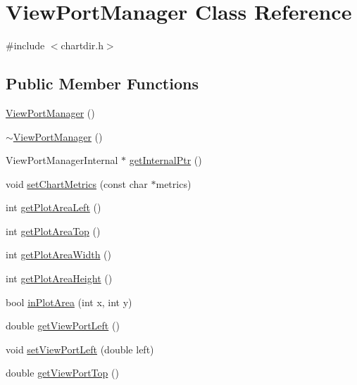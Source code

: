 \hypertarget{class_view_port_manager}{}\section{View\+Port\+Manager Class Reference}
\label{class_view_port_manager}


{\ttfamily \#include $<$chartdir.\+h$>$}

\subsection*{Public Member Functions}
\begin{DoxyCompactItemize}
\item 
\hyperlink{class_view_port_manager_aa1b652e4a2d4d11c50bcb6070506cc52}{View\+Port\+Manager} ()
\item 
\hyperlink{class_view_port_manager_a246382d798570dd477efd4da1946778d}{$\sim$\+View\+Port\+Manager} ()
\item 
View\+Port\+Manager\+Internal $\ast$ \hyperlink{class_view_port_manager_af3aa3a669ee164439737ea284c6c9cdf}{get\+Internal\+Ptr} ()
\item 
void \hyperlink{class_view_port_manager_af4bdc161db91ed516987f6a358f02bab}{set\+Chart\+Metrics} (const char $\ast$metrics)
\item 
int \hyperlink{class_view_port_manager_a244345729e7f3798f509031a72bf7362}{get\+Plot\+Area\+Left} ()
\item 
int \hyperlink{class_view_port_manager_a4f4797760398802b6cc12970f57e3039}{get\+Plot\+Area\+Top} ()
\item 
int \hyperlink{class_view_port_manager_a343ea77ab814cfbb1e47322d11eebf9e}{get\+Plot\+Area\+Width} ()
\item 
int \hyperlink{class_view_port_manager_a27afd05fac15bcaa4f06eb9bc675a6d0}{get\+Plot\+Area\+Height} ()
\item 
bool \hyperlink{class_view_port_manager_ae347d881f810430cc0b8a368c4a349c2}{in\+Plot\+Area} (int x, int y)
\item 
double \hyperlink{class_view_port_manager_a39d80abc4db236ff6657c5974e1a9fda}{get\+View\+Port\+Left} ()
\item 
void \hyperlink{class_view_port_manager_a1270422432f386ab1a0f3c94990c1567}{set\+View\+Port\+Left} (double left)
\item 
double \hyperlink{class_view_port_manager_a83c46dea64613c2e1939933eb6ae17c0}{get\+View\+Port\+Top} ()
\item 

\end{DoxyCompactItemize}
